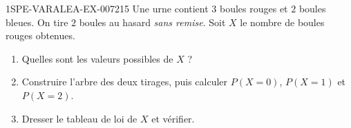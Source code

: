 \begin{exercice}{1SPE-VARALEA-EX-007}{2}{15}
Une urne contient $3$ boules rouges et $2$ boules bleues. On tire $2$ boules au hasard \emph{sans remise}. Soit $X$ le nombre de boules rouges obtenues.

\begin{enumerate}
  \item Quelles sont les valeurs possibles de $X$ ?
  \item Construire l'arbre des deux tirages, puis calculer $P(X=0)$, $P(X=1)$ et $P(X=2)$.
  \item Dresser le tableau de loi de $X$ et vérifier.
\end{enumerate}
\end{exercice}
